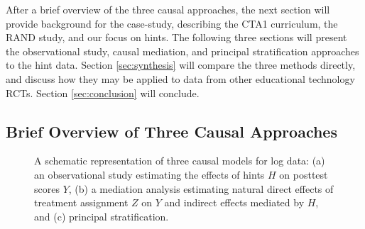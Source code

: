 \documentclass{article}\usepackage[]{graphicx}\usepackage[]{color}
\begin{document}
After a brief overview of the three causal approaches,
the next section will provide background for the case-study,
describing the CTA1 curriculum, the RAND study, and our focus on
hints.
The following three sections will present the observational study,
causal mediation, and principal stratification approaches to the hint
data.
Section \ref{sec:synthesis} will compare the three methods directly,
and discuss how they may be applied to data from other educational
technology RCTs.
Section \ref{sec:conclusion} will conclude.

\subsection{Brief Overview of Three Causal Approaches}
\begin{figure}
\centering
{}
\caption{A schematic representation of three causal models for
  log data: (a) an observational study estimating the effects of hints
  $H$ on posttest scores $Y$, (b) a mediation analysis estimating
  natural direct effects of treatment assignment $Z$ on $Y$ and
  indirect effects mediated by $H$, and (c) principal stratification.}
\label{mediationFig}
\end{figure}
\end{document}
